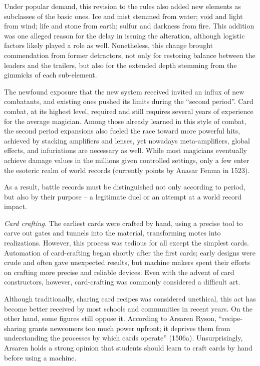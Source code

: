 {	Under popular demand, this revision to the rules also added new elements as subclasses of the basic ones. Ice and mist stemmed from water; void and light from wind; life and stone from earth; sulfur and darkness from fire. This addition was one alleged reason for the delay in issuing the alteration, although logistic factors likely played a role as well. Nonetheless, this change brought commendation from former detractors, not only for restoring balance between the leaders and the trailers, but also for the extended depth stemming from the gimmicks of each sub-element.
	
	The newfound exposure that the new system received invited an influx of new combatants, and existing ones pushed its limits during the ``second period''. Card combat, at its highest level, required and still requires several years of experience for the average magician. Among those already learned in this style of combat, the second period expansions also fueled the race toward more powerful hits, achieved by stacking amplifiers and lenses, yet nowadays meta-amplifiers, global effects, and infuriations are necessary as well. While most magicians eventually achieve damage values in the millions given controlled settings, only a few enter the esoteric realm of world records (currently \iformone{} points by Anasar Fenma in 1523).
	
	As a result, battle records must be distinguished not only according to period, but also by their purpose -- a legitimate duel or an attempt at a world record impact.
	
	\emph{Card crafting.} The earliest cards were crafted by hand, using a precise tool to carve out gates and tunnels into the material, transforming motes into realizations. However, this process was tedious for all except the simplest cards. Automation of card-crafting began shortly after the first cards; early designs were crude and often gave unexpected results, but machine makers spent their efforts on crafting more precise and reliable devices. Even with the advent of card constructors, however, card-crafting was commonly considered a difficult art.
	
	Although traditionally, sharing card recipes was considered unethical, this act has become better received by most schools and communities in recent years. On the other hand, some figures still oppose it. According to Arsaren Ryson, ``recipe-sharing grants newcomers too much power upfront; it deprives them from understanding the processes by which cards operate'' (1506a). Unsurprisingly, Arsaren holds a strong opinion that students should learn to craft cards by hand before using a machine.
	
}
